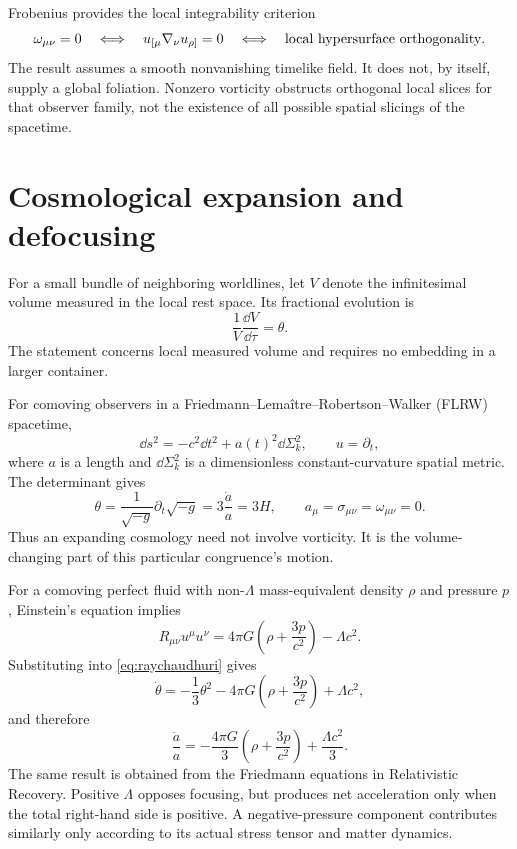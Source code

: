 \documentclass[11pt]{article}
\begin{document}
Frobenius provides the local integrability criterion
\begin{equation}
\omega_{\mu\nu}=0
\quad\Longleftrightarrow\quad
u_{[\mu}\nabla_\nu u_{\rho]}=0
\quad\Longleftrightarrow\quad
\hbox{local hypersurface orthogonality}.
\label{eq:frobenius}
\end{equation}
The result assumes a smooth nonvanishing timelike field. It does not, by itself, supply a global foliation. Nonzero vorticity obstructs orthogonal local slices for that observer family, not the existence of all possible spatial slicings of the spacetime.

\section{Cosmological expansion and defocusing}
For a small bundle of neighboring worldlines, let $V$ denote the infinitesimal volume measured in the local rest space. Its fractional evolution is
\begin{equation}
\frac{1}{V}\frac{\dd V}{\dd\tau}=\theta.
\label{eq:volumeexpansion}
\end{equation}
The statement concerns local measured volume and requires no embedding in a larger container.

For comoving observers in a Friedmann--Lema\^itre--Robertson--Walker (FLRW) spacetime,
\begin{equation}
\dd s^2=-c^2\dd t^2+a(t)^2\dd\Sigma_k^2,\qquad u=\partial_t,
\end{equation}
where $a$ is a length and $\dd\Sigma_k^2$ is a dimensionless constant-curvature spatial metric. The determinant gives
\begin{equation}
\theta=\frac{1}{\sqrt{-g}}\partial_t\sqrt{-g}
=3\frac{\dot a}{a}=3H,
\qquad a_\mu=\sigma_{\mu\nu}=\omega_{\mu\nu}=0.
\label{eq:flrwtheta}
\end{equation}
Thus an expanding cosmology need not involve vorticity. It is the volume-changing part of this particular congruence's motion.

For a comoving perfect fluid with non-$\Lambda$ mass-equivalent density $\rho$ and pressure $p$, Einstein's equation implies
\begin{equation}
R_{\mu\nu}u^\mu u^\nu
=4\pi G\left(\rho+\frac{3p}{c^2}\right)-\Lambda c^2.
\end{equation}
Substituting into \eqref{eq:raychaudhuri} gives
\begin{equation}
\dot\theta=-\frac13\theta^2
-4\pi G\left(\rho+\frac{3p}{c^2}\right)+\Lambda c^2,
\label{eq:raychaudhuri_flrw_lambda}
\end{equation}
and therefore
\begin{equation}
\frac{\ddot a}{a}=-\frac{4\pi G}{3}
\left(\rho+\frac{3p}{c^2}\right)+\frac{\Lambda c^2}{3}.
\label{eq:flrw_accel_lambda}
\end{equation}
The same result is obtained from the Friedmann equations in Relativistic Recovery. Positive $\Lambda$ opposes focusing, but produces net acceleration only when the total right-hand side is positive. A negative-pressure component contributes similarly only according to its actual stress tensor and matter dynamics.
\end{document}
